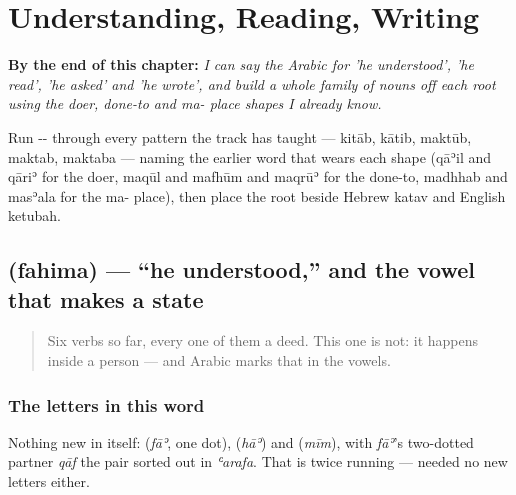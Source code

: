 
\chapter{Understanding, Reading, Writing}
\label{ch:ar-understanding-reading-writing}

\begin{chapteropening}
\textbf{By the end of this chapter:} \emph{I can say the Arabic for 'he understood', 'he read', 'he asked' and 'he wrote', and build a whole family of nouns off each root using the doer, done-to and ma- place shapes I already know.}

Run -- through every pattern the track has taught — kitāb, kātib, maktūb, maktab, maktaba — naming the earlier word that wears each shape (qāʾil and qāriʾ for the doer, maqūl and mafhūm and maqrūʾ for the done-to, madhhab and masʾala for the ma- place), then place the root beside Hebrew katav and English ketubah.
\end{chapteropening}

\section[\texorpdfstring{\ar{فهم} (fahima)}{فهم (fahima)}]{ (fahima) — \textquotedblleft{}he understood,\textquotedblright{} and the vowel that makes a state}

\label{lesson:AR-C31-fahima}



\begin{quote}
Six verbs so far, every one of them a deed. This one is not: it happens inside a person — and Arabic marks that in the vowels.
\end{quote}

\subsection*{The letters in this word}
Nothing new in \textbf{} itself: \textbf{} (\emph{fāʾ}, one dot), \textbf{} (\emph{hāʾ}) and \textbf{} (\emph{mīm}), with \emph{fāʾ}'s two-dotted partner \emph{qāf} the pair sorted out in \emph{ʿarafa}. That is twice running — \textbf{} needed no new letters either.


